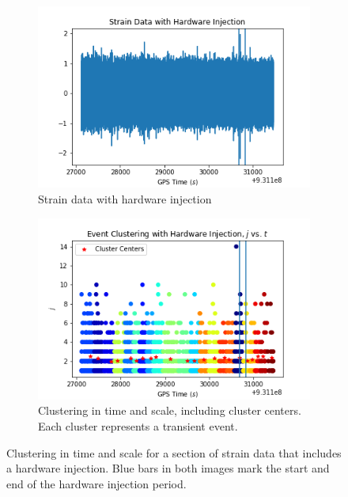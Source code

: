 \documentclass{article}
\begin{document}
\begin{figure}
\begin{subfigure}[t]{\textwidth}
\includegraphics[width=\textwidth]{hw_strain.png}
\caption{Strain data with hardware injection}
\label{fig:hw_strain}
\end{subfigure}

\begin{subfigure}[t]{\textwidth}
\includegraphics[width=\textwidth]{cluster.png}
\caption{Clustering in time and scale, including cluster centers. Each cluster represents a transient event.}
\label{fig:ev_cluster}
\end{subfigure}
\caption{Clustering in time and scale for a section of strain data that includes a hardware injection. Blue bars in both images mark the start and end of the hardware injection period.}
\label{fig:injections}
\end{figure}
\end{document}
